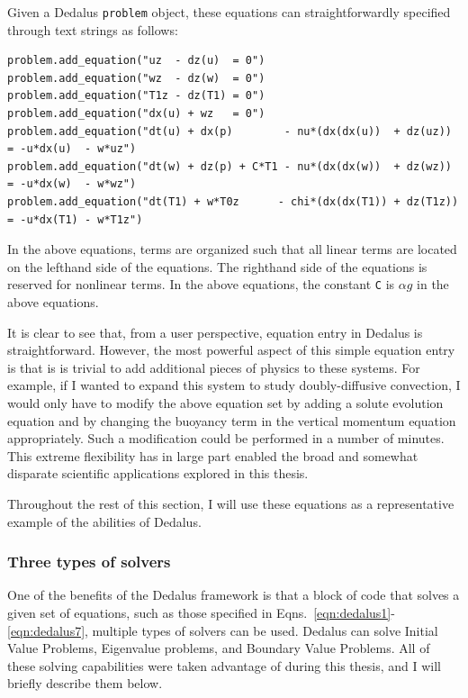 Given a Dedalus \texttt{problem} object, these equations can straightforwardly specified through text strings as follows:
\begingroup
	\fontsize{9.7pt}{9pt}\selectfont
	\begin{verbatim}
problem.add_equation("uz  - dz(u)  = 0")
problem.add_equation("wz  - dz(w)  = 0")
problem.add_equation("T1z - dz(T1) = 0")
problem.add_equation("dx(u) + wz   = 0")
problem.add_equation("dt(u) + dx(p)        - nu*(dx(dx(u))  + dz(uz))  = -u*dx(u)  - w*uz")
problem.add_equation("dt(w) + dz(p) + C*T1 - nu*(dx(dx(w))  + dz(wz))  = -u*dx(w)  - w*wz")
problem.add_equation("dt(T1) + w*T0z      - chi*(dx(dx(T1)) + dz(T1z)) = -u*dx(T1) - w*T1z")
	\end{verbatim}
\endgroup
In the above equations, terms are organized such that all linear terms are located on the lefthand side of the equations.
The righthand side of the equations is reserved for nonlinear terms.
In the above equations, the constant \texttt{C} is $\alpha g$ in the above equations.

It is clear to see that, from a user perspective, equation entry in Dedalus is straightforward.
However, the most powerful aspect of this simple equation entry is that is is trivial to add additional pieces of physics to these systems.
For example, if I wanted to expand this system to study doubly-diffusive convection, I would only have to modify the above equation set by adding a solute evolution equation and by changing the buoyancy term in the vertical momentum equation appropriately.
Such a modification could be performed in a number of minutes.
This extreme flexibility has in large part enabled the broad and somewhat disparate scientific applications explored in this thesis.

Throughout the rest of this section, I will use these equations as a representative example of the abilities of Dedalus.

\subsubsection{Three types of solvers}
One of the benefits of the Dedalus framework is that a block of code that solves a given set of equations, such as those specified in Eqns.~\ref{eqn:dedalus1}-\ref{eqn:dedalus7}, multiple types of solvers can be used.
Dedalus can solve Initial Value Problems, Eigenvalue problems, and Boundary Value Problems.
All of these solving capabilities were taken advantage of during this thesis, and I will briefly describe them below.

